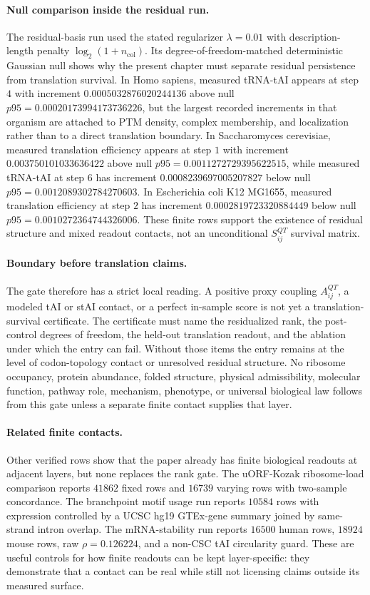 \paragraph{Null comparison inside the residual run.}
The residual-basis run used the stated regularizer $\lambda=0.01$ with description-length penalty $\log_2(1+n_{\mathrm{col}})$.  Its degree-of-freedom-matched deterministic Gaussian null shows why the present chapter must separate residual persistence from translation survival.  In Homo sapiens, measured tRNA-tAI appears at step $4$ with increment $0.0005032876020244136$ above null $p95=0.00020173994173736226$, but the largest recorded increments in that organism are attached to PTM density, complex membership, and localization rather than to a direct translation boundary.  In Saccharomyces cerevisiae, measured translation efficiency appears at step $1$ with increment $0.003750101033636422$ above null $p95=0.0011272729395622515$, while measured tRNA-tAI at step $6$ has increment $0.0008239697005207827$ below null $p95=0.0012089302784270603$.  In Escherichia coli K12 MG1655, measured translation efficiency at step $2$ has increment $0.0002819723320884449$ below null $p95=0.0010272364744326006$.  These finite rows support the existence of residual structure and mixed readout contacts, not an unconditional $S^{QT}_{ij}$ survival matrix.

\paragraph{Boundary before translation claims.}
The gate therefore has a strict local reading.  A positive proxy coupling $A^{QT}_{ij}$, a modeled tAI or stAI contact, or a perfect in-sample score is not yet a translation-survival certificate.  The certificate must name the residualized rank, the post-control degrees of freedom, the held-out translation readout, and the ablation under which the entry can fail.  Without those items the entry remains at the level of codon-topology contact or unresolved residual structure.  No ribosome occupancy, protein abundance, folded structure, physical admissibility, molecular function, pathway role, mechanism, phenotype, or universal biological law follows from this gate unless a separate finite contact supplies that layer.

\paragraph{Related finite contacts.}
Other verified rows show that the paper already has finite biological readouts at adjacent layers, but none replaces the rank gate.  The uORF-Kozak ribosome-load comparison reports $41862$ fixed rows and $16739$ varying rows with two-sample concordance.  The branchpoint motif usage run reports $10584$ rows with expression controlled by a UCSC hg19 GTEx-gene summary joined by same-strand intron overlap.  The mRNA-stability run reports $16500$ human rows, $18924$ mouse rows, raw $\rho=0.126224$, and a non-CSC tAI circularity guard.  These are useful controls for how finite readouts can be kept layer-specific: they demonstrate that a contact can be real while still not licensing claims outside its measured surface.

